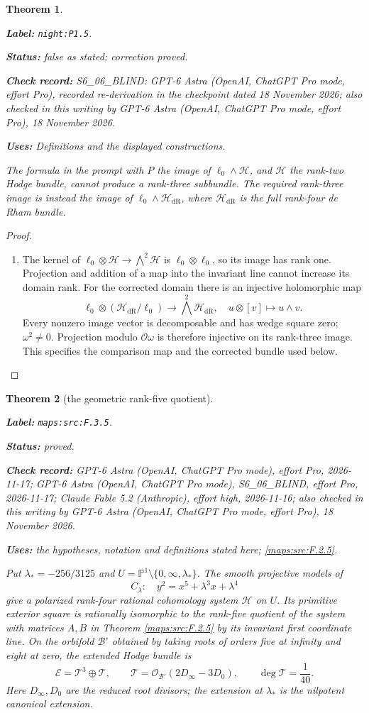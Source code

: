 \documentclass[11pt,a4paper]{article}
\newtheorem{theorem}{Theorem}[section]
\theoremstyle{definition}
\newcommand{\StatementRecord}[4]{\par\smallskip\begingroup\upshape\raggedright\noindent\textbf{Label:} \nolinkurl{#1}.\par\noindent\textbf{Status:} #2.\par\noindent\textbf{Check record:} #3.\par\noindent\textbf{Uses:} #4.\par\endgroup\smallskip}
\newcommand{\CurrentChecker}{GPT-6 Astra (OpenAI, ChatGPT Pro mode, effort Pro), 18 November 2026}
\begin{document}
\begin{theorem}\label{night:P1.5}
\StatementRecord{night:P1.5}{false as stated; correction proved}{S6\_06\_BLIND: GPT-6 Astra (OpenAI, ChatGPT Pro mode, effort Pro), recorded re-derivation in the checkpoint dated 18 November 2026; also checked in this writing by \CurrentChecker}{Definitions and the displayed constructions}
The formula in the prompt with $P$ the image of
$\ell_0\wedge\mathcal H$, and $\mathcal H$ the rank-two Hodge bundle,
cannot produce a rank-three subbundle.  The required rank-three image
is instead the image of $\ell_0\wedge\mathcal H_{\mathrm{dR}}$, where
$\mathcal H_{\mathrm{dR}}$ is the full rank-four de Rham bundle.
\end{theorem}
\begin{proof}
\begin{enumerate}[label=\arabic*.]
\item The kernel of $\ell_0\otimes\mathcal H\to\bigwedge^2\mathcal H$
is $\ell_0\otimes\ell_0$, so its image has rank one.  Projection and
addition of a map into the invariant line cannot increase its domain
rank.  For the corrected domain there is an injective holomorphic map
\[
\ell_0\otimes(\mathcal H_{\mathrm{dR}}/\ell_0)
 \longrightarrow\bigwedge^2\mathcal H_{\mathrm{dR}},\quad
u\otimes[v]\longmapsto u\wedge v.
\]
Every nonzero image vector is decomposable and has wedge square zero;
$\omega^2\ne0$.  Projection modulo $\mathcal O\omega$ is therefore
injective on its rank-three image.  This specifies the comparison map
and the corrected bundle used below.

\end{enumerate}
\end{proof}




\begin{theorem}[the geometric rank-five quotient]\label{maps:src:F.3.5}
\StatementRecord{maps:src:F.3.5}{proved}{GPT-6 Astra (OpenAI, ChatGPT Pro mode), effort Pro, 2026-11-17; GPT-6 Astra (OpenAI, ChatGPT Pro mode), S6\_06\_BLIND, effort Pro, 2026-11-17; Claude Fable 5.2 (Anthropic), effort high, 2026-11-16; also checked in this writing by \CurrentChecker}{the hypotheses, notation and definitions stated here; \cref{maps:src:F.2.5}}


Put $\lambda_*=-256/3125$ and
$U=\mathbb P^1\setminus\{0,\infty,\lambda_*\}$.  The smooth projective
models of
\[
 C_\lambda:\quad y^2=x^5+\lambda^3x+\lambda^4
 \tag{F.7}\label{maps:eq:F.7}
\]
give a polarized rank-four rational cohomology system $\mathcal H$ on
$U$.  Its primitive exterior square is rationally isomorphic to
the rank-five quotient of the system with matrices $A,B$ in
Theorem \ref{maps:src:F.2.5} by its invariant first coordinate line.
On the orbifold $\mathcal B'$ obtained by taking roots of orders
five at infinity and eight at zero, the extended Hodge bundle is
\[
 \mathcal E=\mathcal T^3\oplus\mathcal T,\qquad
 \mathcal T=\mathcal O_{\mathcal B'}(2D_\infty-3D_0),\qquad
 \deg\mathcal T=\frac1{40}.
 \tag{F.8}\label{maps:eq:F.8}
\]
Here $D_\infty,D_0$ are the reduced root divisors; the extension at
$\lambda_*$ is the nilpotent canonical extension.

\end{theorem}
\end{document}
